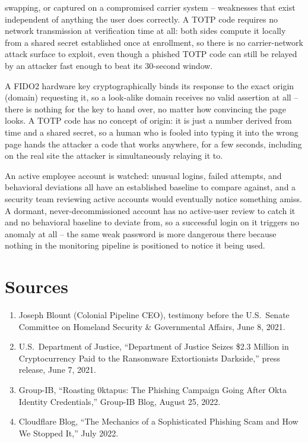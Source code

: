 \begin{answerkey}
swapping, or captured on a compromised carrier system -- weaknesses that exist independent of
anything the user does correctly. A TOTP code requires no network transmission at verification
time at all: both sides compute it locally from a shared secret established once at enrollment, so
there is no carrier-network attack surface to exploit, even though a phished TOTP code can still be
relayed by an attacker fast enough to beat its 30-second window.
\item A FIDO2 hardware key cryptographically binds its response to the exact origin (domain)
requesting it, so a look-alike domain receives no valid assertion at all -- there is nothing for
the key to hand over, no matter how convincing the page looks. A TOTP code has no concept of
origin: it is just a number derived from time and a shared secret, so a human who is fooled into
typing it into the wrong page hands the attacker a code that works anywhere, for a few seconds,
including on the real site the attacker is simultaneously relaying it to.
\item An active employee account is watched: unusual logins, failed attempts, and behavioral
deviations all have an established baseline to compare against, and a security team reviewing
active accounts would eventually notice something amiss. A dormant, never-decommissioned account
has no active-user review to catch it and no behavioral baseline to deviate from, so a successful
login on it triggers no anomaly at all -- the same weak password is more dangerous there because
nothing in the monitoring pipeline is positioned to notice it being used.
\end{answerkey}

\section*{Sources}
\begin{enumerate}[label=\lbrack\arabic*\rbrack, leftmargin=2.2em]
\item {}Joseph Blount (Colonial Pipeline CEO), testimony before the U.S.\ Senate
Committee on Homeland Security \& Governmental Affairs, June 8, 2021.
\item {}U.S.\ Department of Justice, ``Department of Justice Seizes \$2.3 Million in
Cryptocurrency Paid to the Ransomware Extortionists Darkside,'' press release, June 7, 2021.
\item {}Group-IB, ``Roasting 0ktapus: The Phishing Campaign Going After Okta Identity
Credentials,'' Group-IB Blog, August 25, 2022.
\item {}Cloudflare Blog, ``The Mechanics of a Sophisticated Phishing Scam and How We
Stopped It,'' July 2022.
\end{enumerate}

